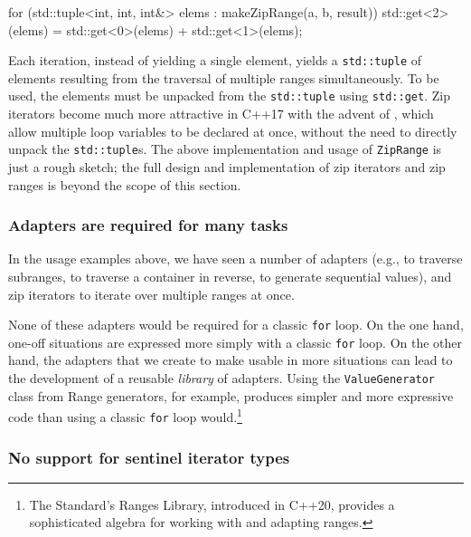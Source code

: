 {{{\begin{emcppslisting}
{    for (std::tuple<int, int, int&> elems : makeZipRange(a, b, result))
    {
        std::get<2>(elems) = std::get<0>(elems) + std::get<1>(elems);
    }
}
\end{emcppslisting}

\noindent Each iteration, instead of yielding a single element, yields a
\lstinline!std::tuple! of elements resulting from the traversal of multiple
ranges simultaneously. To be used, the elements must be unpacked from
the \lstinline!std::tuple! using \lstinline!std::get!. Zip iterators become
much more attractive in C++17 with the advent of , which allow multiple loop variables to be declared at once,
without the need to directly unpack the \lstinline!std::tuple!s. The above
implementation and usage of \lstinline!ZipRange! is just a rough sketch;
the full design and implementation of zip iterators and zip ranges is
beyond the scope of this section.

\subsubsection[Adapters are required for many tasks]{Adapters are required for many tasks}\label{adapters-are-required-for-many-tasks}

In the usage examples above, we have seen a number of adapters (e.g., to
traverse subranges, to traverse a container in reverse, to generate
sequential values), and zip iterators to iterate over multiple ranges at
once.

None of these adapters would be required for a classic \lstinline!for!
loop. On the one hand, one-off situations are expressed more simply with
a classic \lstinline!for! loop. On the other hand, the adapters that we
create to make  usable in more
situations can lead to the development of a reusable \emph{library} of
adapters. Using the \lstinline!ValueGenerator! class from {Range
generators}, for example, produces simpler and more expressive code than
using a classic \lstinline!for! loop would.{\cprotect\footnote{The
Standard's Ranges Library, introduced in C++20, provides a
  sophisticated algebra for working with and adapting ranges.}}

\subsubsection[No support for sentinel iterator types]{No support for sentinel iterator types}\label{no-support-for-sentinel-iterator-types}

}}}
